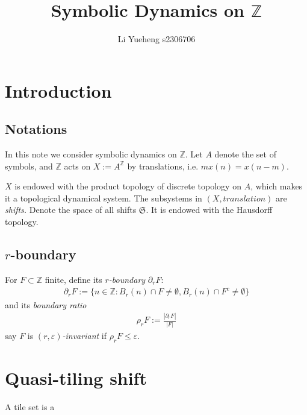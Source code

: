 \documentclass{article}
\begin{document}
\title{Symbolic Dynamics on $\mathbb{Z}$}
\author{Li Yueheng s2306706}

\maketitle


\section{Introduction}
\subsection{Notations}
In this note we consider symbolic dynamics on $\mathbb{Z}$. Let $A$ denote the set of symbols, and $\mathbb{Z}$ acts on $X:=A^\mathbb{Z}$ by translations, i.e. $mx(n)=x(n-m)$.

$X$ is endowed with the product topology of discrete topology on $A$, which makes it a topological dynamical system. The subsystems in $(X,translation)$ are \emph{shifts.} Denote the space of all shifts $\mathfrak{S}$. It is endowed with the Hausdorff topology.



\subsection{$r$-boundary}
For $F\subset \mathbb{Z}$ finite, define its \emph{$r$-boundary} $\partial_r F$:
\begin{align*}
	\partial_r F :=\{n\in \mathbb{Z}:B_r(n)\cap F\neq \emptyset, B_r(n)\cap F^c\neq\emptyset\}
\end{align*}
and its \emph{boundary ratio}
\begin{align*}
	\rho_r F:=\frac{|\partial_r F |}{|F|}
\end{align*}
say $F$ is \emph{ $(r,\varepsilon)$-invariant} if $\rho_r F\leq \varepsilon$.




\section{Quasi-tiling shift}

A tile set is a 
\end{document}

